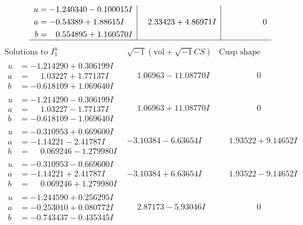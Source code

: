 \documentclass[1p]{elsarticle_modified}
\theoremstyle{definition}
\newcommand{\I}{\sqrt{-1}}
\begin{document}
$$\begin{array}{c|c|c}
\begin{aligned}
u &= -1.240340 - 0.100015 I \\
a &= -0.54389 + 1.88615 I \\
b &= \phantom{-}0.554895 + 1.160570 I\end{aligned}
 & \phantom{-}2.33423 + 4.86971 I & \phantom{-0.000000 } 0\\
 \hline 
 \end{array}$$\newpage$$\begin{array}{c|c|c}  
\text{Solutions to }I^u_{1}& \I (\text{vol} + \sqrt{-1}CS) & \text{Cusp shape}\\
 \hline 
\begin{aligned}
u &= -1.214290 + 0.306199 I \\
a &= \phantom{-}1.03227 + 1.77137 I \\
b &= -0.618109 + 1.069640 I\end{aligned}
 & \phantom{-}1.06963 - 11.08770 I & \phantom{-0.000000 } 0 \\ \hline\begin{aligned}
u &= -1.214290 - 0.306199 I \\
a &= \phantom{-}1.03227 - 1.77137 I \\
b &= -0.618109 - 1.069640 I\end{aligned}
 & \phantom{-}1.06963 + 11.08770 I & \phantom{-0.000000 } 0 \\ \hline\begin{aligned}
u &= -0.310953 + 0.669600 I \\
a &= -1.14221 - 2.41787 I \\
b &= \phantom{-}0.069246 - 1.279980 I\end{aligned}
 & -3.10384 - 6.63654 I & \phantom{-}1.93522 + 9.14652 I \\ \hline\begin{aligned}
u &= -0.310953 - 0.669600 I \\
a &= -1.14221 + 2.41787 I \\
b &= \phantom{-}0.069246 + 1.279980 I\end{aligned}
 & -3.10384 + 6.63654 I & \phantom{-}1.93522 - 9.14652 I \\ \hline\begin{aligned}
u &= -1.244590 + 0.256295 I \\
a &= -0.253010 + 0.080772 I \\
b &= -0.743437 - 0.435345 I\end{aligned}
 & \phantom{-}2.87173 - 5.93046 I & \phantom{-0.000000 } 0 \\ \hline\begin{aligned}

\end{aligned}
\end{array}$$
\end{document}
